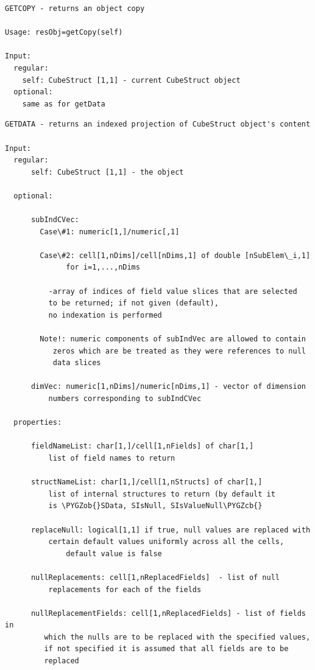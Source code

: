 \documentclass[letterpaper,10pt,english]{sphinxmanual}
\def\PYGZob{\char`\{}
\def\PYGZcb{\char`\}}
\begin{document}
\begin{Verbatim}[commandchars=\\\{\}]
GETCOPY - returns an object copy

Usage: resObj=getCopy(self)

Input:
  regular:
    self: CubeStruct [1,1] - current CubeStruct object
  optional:
    same as for getData
\end{Verbatim}

\begin{Verbatim}[commandchars=\\\{\}]
GETDATA - returns an indexed projection of CubeStruct object's content

Input:
  regular:
      self: CubeStruct [1,1] - the object

  optional:

      subIndCVec:
        Case\#1: numeric[1,]/numeric[,1]

        Case\#2: cell[1,nDims]/cell[nDims,1] of double [nSubElem\_i,1]
              for i=1,...,nDims

          -array of indices of field value slices that are selected
          to be returned; if not given (default),
          no indexation is performed

        Note!: numeric components of subIndVec are allowed to contain
           zeros which are be treated as they were references to null
           data slices

      dimVec: numeric[1,nDims]/numeric[nDims,1] - vector of dimension
          numbers corresponding to subIndCVec

  properties:

      fieldNameList: char[1,]/cell[1,nFields] of char[1,]
          list of field names to return

      structNameList: char[1,]/cell[1,nStructs] of char[1,]
          list of internal structures to return (by default it
          is \PYGZob{}SData, SIsNull, SIsValueNull\PYGZcb{}

      replaceNull: logical[1,1] if true, null values are replaced with
          certain default values uniformly across all the cells,
              default value is false

      nullReplacements: cell[1,nReplacedFields]  - list of null
          replacements for each of the fields

      nullReplacementFields: cell[1,nReplacedFields] - list of fields in
         which the nulls are to be replaced with the specified values,
         if not specified it is assumed that all fields are to be
         replaced


\end{Verbatim}
\end{document}
